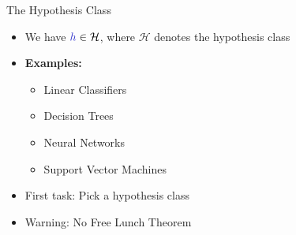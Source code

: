 \documentclass[aspectratio=169,10pt]{beamer}
\begin{document}
\begin{frame}{The Hypothesis Class}
	\begin{itemize}
		\item We have $\hypothesis \in \mathcal{H}$, where $\mathcal{H}$ denotes the hypothesis class
		\item \alert{\textbf{Examples:}}
		\begin{itemize}
			\item Linear Classifiers
			\item Decision Trees
			\item Neural Networks
			\item Support Vector Machines
		\end{itemize} 
	\vspace{0.4cm}
		\item First task: Pick a hypothesis class
		\item \alert{Warning:} No Free Lunch Theorem
	\end{itemize}

\end{frame}
\end{document}
